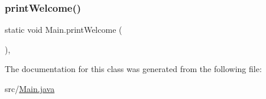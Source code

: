 \mbox{\label{class_main_adbd81691fbbab226d1411b7cf0b11441}} 
\subsubsection{\texorpdfstring{print\+Welcome()}{printWelcome()}}
{\footnotesize\ttfamily static void Main.\+print\+Welcome (\begin{DoxyParamCaption}{ }\end{DoxyParamCaption})\hspace{0.3cm}{\ttfamily [static]}, {\ttfamily [private]}}



The documentation for this class was generated from the following file\+:\begin{DoxyCompactItemize}
\item 
src/\mbox{\hyperlink{_main_8java}{Main.\+java}}\end{DoxyCompactItemize}

